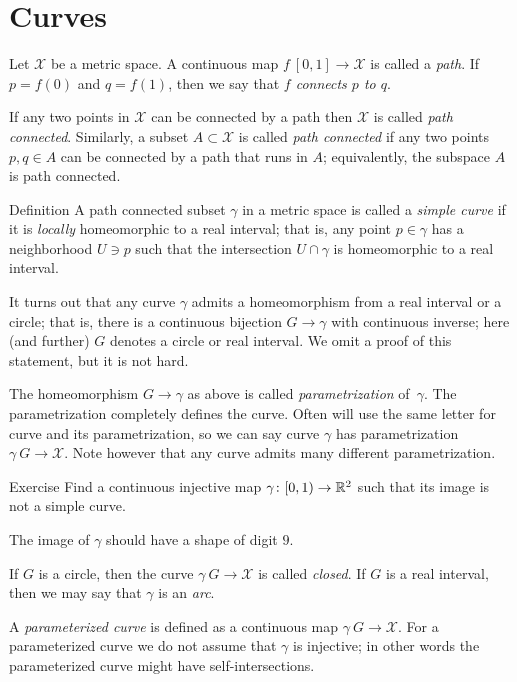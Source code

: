 \chapter{Curves}

Let $\mathcal{X}$ be a metric space.
A continuous map $f\:[0,1]\to\mathcal{X}$ is called a \emph{path}.
If $p=f(0)$ and $q=f(1)$, then we say that \emph{$f$ connects $p$ to $q$}.

If any two points in $\mathcal{X}$ can be connected by a path then $\mathcal{X}$ is called \emph{path connected}.
Similarly, a subset $A\subset \mathcal{X}$ is called \emph{path connected} if any two points $p,q\in A$ can be connected by a path that runs in $A$;
equivalently, the subspace $A$ is path connected.


\begin{thm}{Definition} 
A path connected subset $\gamma$ in a metric space is called a \emph{simple curve} if it is \emph{locally} homeomorphic to a real interval; that is, any point $p\in\gamma$ has a neighborhood $U\ni p$ such that the intersection
$U\cap \gamma$ is homeomorphic to a real interval.
\end{thm}

It turns out that any curve $\gamma$ admits a homeomorphism from a real interval or a circle;
that is, there is a continuous bijection $G\to \gamma$ with continuous inverse;
here (and further) $G$ denotes a circle or real interval.
We omit a proof of this statement, but it is not hard.

The homeomorphism $G\to \gamma$ as above is called \emph{parametrization} of~$\gamma$.
The parametrization completely defines the curve.
Often will use the same letter for curve and its parametrization, so we can say curve $\gamma$ has parametrization $\gamma\:G\to \mathcal{X}$.
Note however that any curve admits many different parametrization. 

\begin{thm}{Exercise}
Find a continuous injective map $\gamma\colon[0,1)\to\mathbb{R}^2$ such that its image is not a simple curve.
\end{thm}

 The image of $\gamma$ should have a shape of digit $9$.


If $G$ is a circle, then the curve $\gamma\:G\to \mathcal{X}$ is called \emph{closed}.
If $G$ is a real interval, then  we may say that $\gamma$ is an \emph{arc}.

A \emph{parameterized curve} is defined as a continuous map $\gamma\: G\to \mathcal{X}$. 
For a parameterized curve we do not assume that $\gamma$ is injective; in other words the parameterized curve might have self-intersections.

